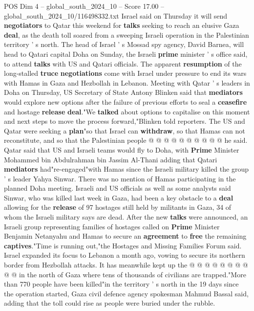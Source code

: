 \begin{textsample}{POS Dim 4 – global\_south\_2024\_10 – Score 17.00 – global\_south\_2024\_10/116498332.txt}  \label{ex:f4_pos_397}
Israel said on Thursday it will send \textbf{negotiators} to Qatar this weekend for \textbf{talks} seeking to reach an elusive Gaza \textbf{deal}, as the death toll soared from a sweeping Israeli operation in the Palestinian territory ' s north.
The head of Israel ' s Mossad spy agency, David Barnea, will head to Qatari capital Doha on Sunday, the Israeli \textbf{prime} minister ' s office said, to attend \textbf{talks} with US and Qatari officials.
The apparent \textbf{resumption} of the long-stalled \textbf{truce} \textbf{negotiations} come with Israel under pressure to end its wars with Hamas in Gaza and Hezbollah in Lebanon.
Meeting with Qatar ' s leaders in Doha on Thursday, US Secretary of State Antony Blinken said that \textbf{mediators} would explore new options after the failure of previous efforts to seal a \textbf{ceasefire} and hostage \textbf{release} \textbf{deal}."We \textbf{talked} about options to capitalise on this moment and next steps to move the process forward,"Blinken told reporters.
The US and Qatar were seeking a \textbf{plan}"so that Israel can \textbf{withdraw}, so that Hamas can not reconstitute, and so that the Palestinian people @ @ @ @ @ @ @ @ @ @ he said.
Qatar said that US and Israeli teams would fly to Doha, with \textbf{Prime} Minister Mohammed bin Abdulrahman bin Jassim Al-Thani adding that Qatari \textbf{mediators} had"re-engaged"with Hamas since the Israeli military killed the group ' s leader Yahya Sinwar.
There was no mention of Hamas participating in the planned Doha meeting.
Israeli and US officials as well as some analysts said Sinwar, who was killed last week in Gaza, had been a key obstacle to a \textbf{deal} allowing for the \textbf{release} of 97 hostages still held by militants in Gaza, 34 of whom the Israeli military says are dead.
After the new \textbf{talks} were announced, an Israeli group representing families of hostages called on \textbf{Prime} Minister Benjamin Netanyahu and Hamas to secure an \textbf{agreement} to \textbf{free} the remaining \textbf{captives}."Time is running out,"the Hostages and Missing Families Forum said.
Israel expanded its focus to Lebanon a month ago, vowing to secure its northern border from Hezbollah attacks.
It has meanwhile kept up the @ @ @ @ @ @ @ @ @ @ in the north of Gaza where tens of thousands of civilians are trapped."More than 770 people have been killed"in the territory ' s north in the 19 days since the operation started, Gaza civil defence agency spokesman Mahmud Bassal said, adding that the toll could rise as people were buried under the rubble.

\end{textsample}
